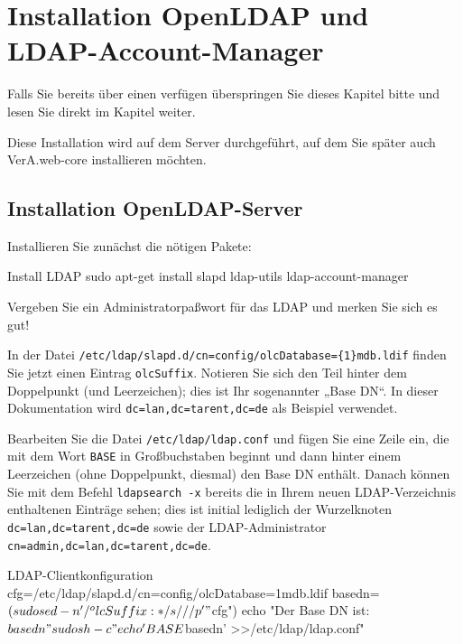 \section{Installation OpenLDAP und LDAP-Account-Manager}\label{sec:setup-lam}

Falls Sie bereits über einen  verfügen
überspringen Sie dieses Kapitel bitte und lesen Sie direkt im Kapitel
\ifoa
\else%
\fi%
weiter.

Diese Installation wird auf dem Server durchgeführt, auf dem Sie
später auch VerA.web-core installieren möchten.

\subsection{Installation OpenLDAP-Server}\label{subsec:setup-lam-slapd}

\begin{minipage}{\textwidth}
Installieren Sie zunächst die nötigen Pakete:

\begin{lstdump}{Install LDAP}
sudo apt-get install slapd ldap-utils ldap-account-manager
\end{lstdump}

Vergeben Sie ein Administratorpaßwort für das LDAP und merken
Sie sich es gut!
\end{minipage}

In der Datei \texttt{/etc/ldap/slapd.d/cn=config/olcDatabase=\{1\}mdb.ldif}
finden Sie jetzt einen Eintrag \texttt{olcSuffix}. Notieren Sie sich den
Teil hinter dem Doppelpunkt (und Leerzeichen); dies ist Ihr sogenannter
„Base DN“. In dieser Dokumentation wird \texttt{dc=lan,dc=tarent,dc=de} als
Beispiel verwendet.

Bearbeiten Sie die Datei \texttt{/etc/ldap/ldap.conf} und fügen Sie eine
Zeile ein, die mit dem Wort \texttt{BASE} in Großbuchstaben beginnt und dann
hinter einem Leerzeichen (ohne Doppelpunkt, diesmal) den Base DN enthält.
Danach können Sie mit dem Befehl \texttt{ldapsearch -x} bereits die in
Ihrem neuen LDAP-Verzeichnis enthaltenen Einträge sehen; dies ist initial
lediglich der Wurzelknoten \texttt{dc=lan,dc=tarent,dc=de} sowie der
LDAP-Administrator \texttt{cn=admin,dc=lan,dc=tarent,dc=de}.

\begin{minipage}{\textwidth}
\begin{lstdump}{LDAP-Clientkonfiguration}
cfg=/etc/ldap/slapd.d/cn=config/olcDatabase={1}mdb.ldif
basedn=$(sudo sed -n '/^olcSuffix: */s///p' "$cfg")
echo "Der Base DN ist: $basedn"
sudo sh -c "echo 'BASE $basedn' >>/etc/ldap/ldap.conf"
\end{lstdump}
\end{minipage}

